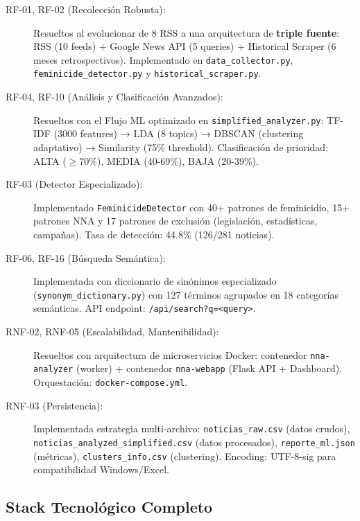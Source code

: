 \begin{description}
    \item[RF-01, RF-02 (Recolección Robusta):] Resueltos al evolucionar de 8 RSS a una arquitectura de \textbf{triple fuente}: RSS (10 feeds) + Google News API (5 queries) + Historical Scraper (6 meses retrospectivos). Implementado en \texttt{data\_collector.py}, \texttt{feminicide\_detector.py} y \texttt{historical\_scraper.py}.
    
    \item[RF-04, RF-10 (Análisis y Clasificación Avanzados):] Resueltos con el Flujo ML optimizado en \texttt{simplified\_analyzer.py}: TF-IDF (3000 features) → LDA (8 topics) → DBSCAN (clustering adaptativo) → Similarity (75\% threshold). Clasificación de prioridad: ALTA ($\geq$70\%), MEDIA (40-69\%), BAJA (20-39\%).
    
    \item[RF-03 (Detector Especializado):] Implementado \texttt{FeminicideDetector} con 40+ patrones de feminicidio, 15+ patrones NNA y 17 patrones de exclusión (legislación, estadísticas, campañas). Tasa de detección: 44.8\% (126/281 noticias).
    
    \item[RF-06, RF-16 (Búsqueda Semántica):] Implementada con diccionario de sinónimos especializado (\texttt{synonym\_dictionary.py}) con 127 términos agrupados en 18 categorías semánticas. API endpoint: \texttt{/api/search?q=<query>}.
    
    \item[RNF-02, RNF-05 (Escalabilidad, Mantenibilidad):] Resueltos con arquitectura de microservicios Docker: contenedor \texttt{nna-analyzer} (worker) + contenedor \texttt{nna-webapp} (Flask API + Dashboard). Orquestación: \texttt{docker-compose.yml}.
    
    \item[RNF-03 (Persistencia):] Implementada estrategia multi-archivo: \texttt{noticias\_raw.csv} (datos crudos), \texttt{noticias\_analyzed\_simplified.csv} (datos procesados), \texttt{reporte\_ml.json} (métricas), \texttt{clusters\_info.csv} (clustering). Encoding: UTF-8-sig para compatibilidad Windows/Excel.
\end{description}

\subsection{Stack Tecnológico Completo}
\label{subsec:p2_stack}

